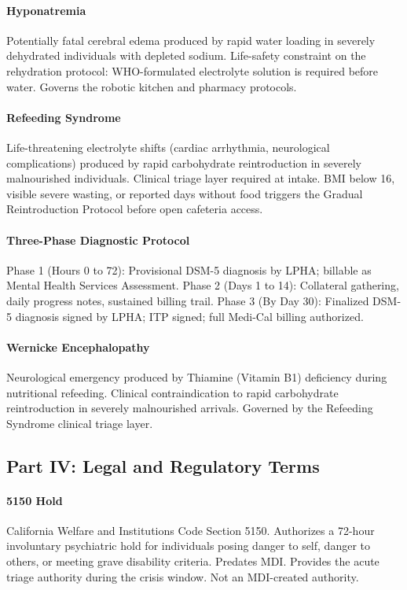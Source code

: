 {\paragraph{Hyponatremia} Potentially fatal cerebral edema produced by rapid water loading in severely dehydrated individuals with depleted sodium. Life-safety constraint on the rehydration protocol: WHO-formulated electrolyte solution is required before water. Governs the robotic kitchen and pharmacy protocols.

\paragraph{Refeeding Syndrome} Life-threatening electrolyte shifts (cardiac arrhythmia, neurological complications) produced by rapid carbohydrate reintroduction in severely malnourished individuals. Clinical triage layer required at intake. BMI below 16, visible severe wasting, or reported days without food triggers the Gradual Reintroduction Protocol before open cafeteria access.

\paragraph{Three-Phase Diagnostic Protocol} Phase 1 (Hours 0 to 72): Provisional DSM-5 diagnosis by LPHA; billable as Mental Health Services Assessment. Phase 2 (Days 1 to 14): Collateral gathering, daily progress notes, sustained billing trail. Phase 3 (By Day 30): Finalized DSM-5 diagnosis signed by LPHA; ITP signed; full Medi-Cal billing authorized.

\paragraph{Wernicke Encephalopathy} Neurological emergency produced by Thiamine (Vitamin B1) deficiency during nutritional refeeding. Clinical contraindication to rapid carbohydrate reintroduction in severely malnourished arrivals. Governed by the Refeeding Syndrome clinical triage layer.

\subsection*{Part IV: Legal and Regulatory Terms}

\paragraph{5150 Hold} California Welfare and Institutions Code Section 5150. Authorizes a 72-hour involuntary psychiatric hold for individuals posing danger to self, danger to others, or meeting grave disability criteria. Predates MDI. Provides the acute triage authority during the crisis window. Not an MDI-created authority.

}
